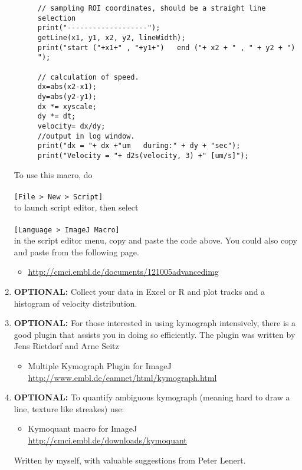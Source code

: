\documentclass[11pnt]{article}
\begin{document}
\begin{enumerate}
\begin{description}
\begin{verbatim}
// sampling ROI coordinates, should be a straight line selection
print("-------------------");
getLine(x1, y1, x2, y2, lineWidth);
print("start ("+x1+" , "+y1+")   end ("+ x2 + " , " + y2 + ") ");

// calculation of speed. 
dx=abs(x2-x1);
dy=abs(y2-y1);
dx *= xyscale;
dy *= dt;
velocity= dx/dy;
//output in log window.
print("dx = "+ dx +"um   during:" + dy + "sec");
print("Velocity = "+ d2s(velocity, 3) +" [um/s]");
\end{verbatim}
\end{description}

To use this macro, do 
\\
\\
\verb"[File > New > Script]"
\\
to launch script editor, then select 
\\
\\
\verb"[Language > ImageJ Macro]" 
\\
in the script editor menu, copy and paste the code above. You could also copy and paste from the following page. 
\begin{itemize}
\item \url{http://cmci.embl.de/documents/121005advancedimg}
\end{itemize}

\item \textbf{OPTIONAL:} Collect your data in Excel or R and plot tracks and a histogram of velocity distribution.


\item \textbf{OPTIONAL:} For those interested in using kymograph intensively, there is a good plugin that assists you in doing so efficiently. The plugin was written by Jens Rietdorf and Arne Seitz
\begin{itemize}
\item Multiple Kymograph Plugin for ImageJ\\  \url{http://www.embl.de/eamnet/html/kymograph.html}
\end{itemize}

\item \textbf{OPTIONAL:} To quantify ambiguous kymograph (meaning hard to draw a line, texture like streakes) use:
\begin{itemize}
\item Kymoquant macro for ImageJ\\ \url{http://cmci.embl.de/downloads/kymoquant}
\end{itemize}
Written by myself, with valuable suggestions from Peter Lenert. 

\end{enumerate}
\end{document}
